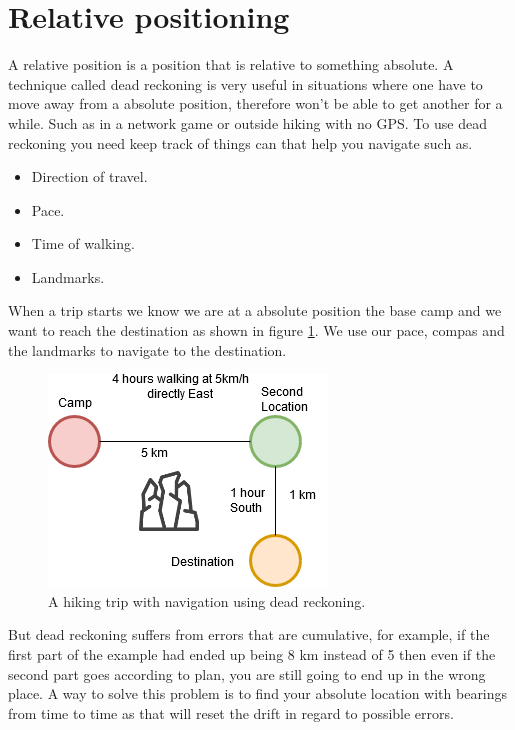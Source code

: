 \section{Relative positioning}
A relative position is a position that is relative to something absolute. A technique called dead reckoning is very useful in situations where one have to move away from a absolute position, therefore won't be able to get another for a while. Such as in a network game or outside hiking with no GPS. To use dead reckoning you need keep track of things can that help you navigate such as. 
\begin{itemize}
\item Direction of travel.
\item Pace.
\item Time of walking.
\item Landmarks.
\end{itemize}
When a trip starts we know we are at a absolute position the base camp and we want to reach the destination as shown in figure \ref{fig:deadrecdrawing}. We use our pace, compas and the landmarks to navigate to the destination.
\begin{figure}[H]
	\centering
	\includegraphics[width=0.4\linewidth]{positioning/positioning/deadRecDrawing}
	\caption{A hiking trip with navigation using dead reckoning.}
	\label{fig:deadrecdrawing}
\end{figure}
But dead reckoning suffers from errors that are cumulative, for example, if the first part of the example had ended up being 8 km instead of 5 then even if the second part goes according to plan, you are still going to end up in the wrong place. A way to solve this problem is to find your absolute location with bearings from time to time as that will reset the drift in regard to possible errors.
